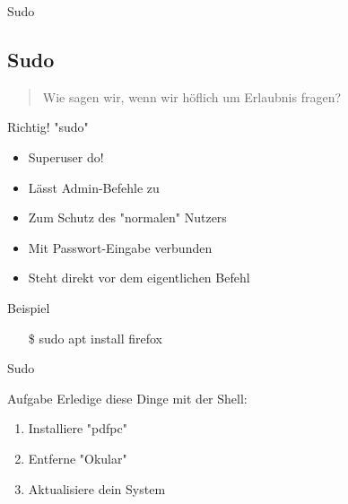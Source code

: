\begin{frame}{Sudo}
    \subsection{Sudo}\label{subsec:sudo}

    \begin{quote}
        Wie sagen wir, wenn wir höflich um Erlaubnis fragen?
    \end{quote}
    \pause

    \textrightarrow Richtig! "sudo"
    \pause

    \begin{itemize}
        \item Superuser do!\pause
        \item Lässt Admin-Befehle zu\pause
        \item Zum Schutz des "normalen" Nutzers\pause
        \item Mit Passwort-Eingabe verbunden\pause
        \item Steht direkt vor dem eigentlichen Befehl
    \end{itemize}
    \pause

    \vspace{0.5cm}
    \begin{exampleblock}{Beispiel}
        \begin{itemize}
            \item[\$] sudo apt install firefox
        \end{itemize}
    \end{exampleblock}

\end{frame}

\begin{frame}{Sudo}
    \begin{alertblock}{Aufgabe}
        Erledige diese Dinge mit der Shell:
        \begin{enumerate}
            \item Installiere "pdfpc"\pause
            \item Entferne "Okular"\pause
            \item Aktualisiere dein System
        \end{enumerate}
    \end{alertblock}
\end{frame}

